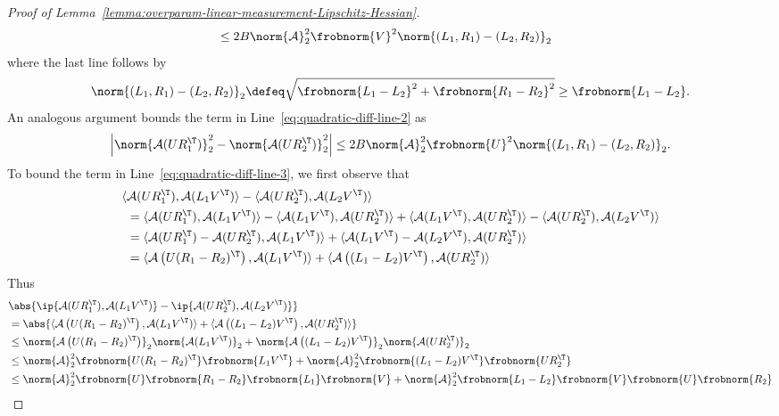 \begin{proof}[Proof of Lemma~\ref{lemma:overparam-linear-measurement-Lipschitz-Hessian}]
\begin{align*}
        &\leq 2B \norm{\mathcal{A}}^2_2 \frobnorm{V}^2 \norm{(L_1, R_1)-(L_2, R_2)}_2
    \end{align*}
    where the last line follows by
     \[
        \norm{(L_1, R_1)-(L_2, R_2)}_2 \defeq \sqrt{\frobnorm{L_1-L_2}^2 + \frobnorm{R_1-R_2}^2} \geq \frobnorm{L_1 - L_2}.
     \]
     An analogous argument bounds the term in Line~\ref{eq:quadratic-diff-line-2} as
     \[
        \left|\norm{\mathcal{A}(UR_1^\T)}^2_2-\norm{\mathcal{A}(UR_2^\T)}^2_2\right|\leq 2B \norm{\mathcal{A}}^2_2 \frobnorm{U}^2 \norm{(L_1, R_1)-(L_2, R_2)}_2.
     \]
     To bound the term in Line~\ref{eq:quadratic-diff-line-3}, we first observe that
     \begin{align*}
        \langle &\mathcal{A}(UR_1^\T), \mathcal{A}(L_1V^\T)\rangle-\langle \mathcal{A}(UR_2^\T), \mathcal{A}(L_2V^\T)\rangle\\
        &=\langle \mathcal{A}(UR_1^\T), \mathcal{A}(L_1V^\T)\rangle- \langle\mathcal{A}(L_1V^\T), \mathcal{A}(U R_2^\T)\rangle+\langle\mathcal{A}(L_1V^\T), \mathcal{A}(U R_2^\T)\rangle - \langle \mathcal{A}(UR_2^\T), \mathcal{A}(L_2V^\T)\rangle\\
        &=\langle \mathcal{A}(UR_1^\T) - \mathcal{A}(U R_2^\T), \mathcal{A}(L_1V^\T)\rangle+\langle\mathcal{A}(L_1V^\T)-\mathcal{A}(L_2V^\T), \mathcal{A}(U R_2^\T)\rangle\\
        &=\langle \mathcal{A}\left(U(R_1-R_2)^\T\right), \mathcal{A}(L_1V^\T)\rangle+\langle\mathcal{A}\left((L_1-L_2)V^\T\right), \mathcal{A}(U R_2^\T)\rangle
     \end{align*}
     Thus
     \begin{align*}
        & \abs{\ip{\mathcal{A}(UR_1^\T), \mathcal{A}(L_1V^\T)}-\ip{ \mathcal{A}(UR_2^\T), \mathcal{A}(L_2V^\T)}}\\
        &=\abs{\langle \mathcal{A}\left(U(R_1-R_2)^\T\right), \mathcal{A}(L_1V^\T)\rangle+\langle\mathcal{A}\left((L_1-L_2)V^\T\right), \mathcal{A}(U R_2^\T)\rangle}\\
        &\leq \norm{\mathcal{A}\left(U(R_1-R_2)^\T\right)}_2\norm{\mathcal{A}(L_1V^\T)}_2+\norm{\mathcal{A}\left((L_1-L_2)V^\T\right)}_2 \norm{\mathcal{A}(U R_2^\T)}_2\\
        &\leq \norm{\mathcal{A}}^2_2\frobnorm{U(R_1-R_2)^\T}\frobnorm{L_1V^\T}+\norm{\mathcal{A}}^2_2\frobnorm{(L_1-L_2)V^\T} \frobnorm{U R_2^\T}\\
        &\leq \norm{\mathcal{A}}^2_2\frobnorm{U}\frobnorm{R_1-R_2}\frobnorm{L_1}\frobnorm{V}+\norm{\mathcal{A}}^2_2\frobnorm{L_1-L_2}\frobnorm{V} \frobnorm{U} \frobnorm{R_2}\\

\end{align*}
\end{proof}
